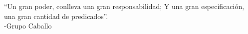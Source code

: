 \documentclass[10pt,a4paper]{article}
\begin{document}
\begin{minipage}[t]{19cm}
\end{minipage}

\vspace{1cm}

“Un gran poder, conlleva una gran responsabilidad; Y una gran especificación, una gran cantidad de predicados”. \\
-Grupo Caballo
\end{document}
